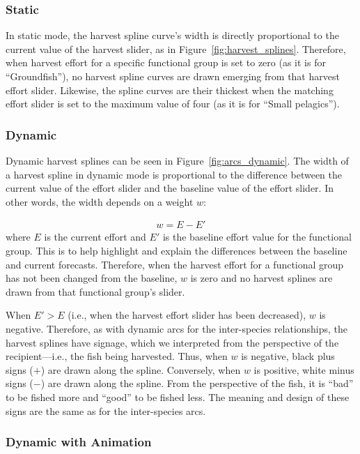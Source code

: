 \subsubsection{Static}

In static mode, the harvest spline curve's width is directly proportional to the current value of the harvest slider, as in Figure~\ref{fig:harvest_splines}.  Therefore, when harvest effort for a specific functional group is set to zero (as it is for ``Groundfish''), no harvest spline curves are drawn emerging from that harvest effort slider.  Likewise, the spline curves are their thickest when the matching effort slider is set to the maximum value of four (as it is for ``Small pelagics'').

\subsubsection{Dynamic}

Dynamic harvest splines can be seen in Figure~\ref{fig:arcs_dynamic}.  The width of a harvest spline in dynamic mode is proportional to the difference between the current value of the effort slider and the baseline value of the effort slider.  In other words, the width depends on a weight $w$:

\begin{align}
w = E - E'
\end{align}
where $E$ is the current effort and $E'$ is the baseline effort value for the functional group.  This is to help highlight and explain the differences between the baseline and current forecasts.   Therefore, when the harvest effort for a functional group has not been changed from the baseline, $w$ is zero and no harvest splines are drawn from that functional group's slider.

When $E' > E$ (i.e., when the harvest effort slider has been decreased), $w$ is negative.  Therefore, as with dynamic arcs for the inter-species relationships, the harvest splines have signage, which we interpreted from the perspective of the recipient---i.e., the fish being harvested.  Thus, when $w$ is negative, black plus signs ($+$) are drawn along the spline.  Conversely, when $w$ is positive, white minus signs ($-$) are drawn along the spline.  From the perspective of the fish, it is ``bad'' to be fished more and ``good'' to be fished less.  The meaning and design of these signs are the same as for the inter-species arcs.

\subsubsection{Dynamic with Animation}

